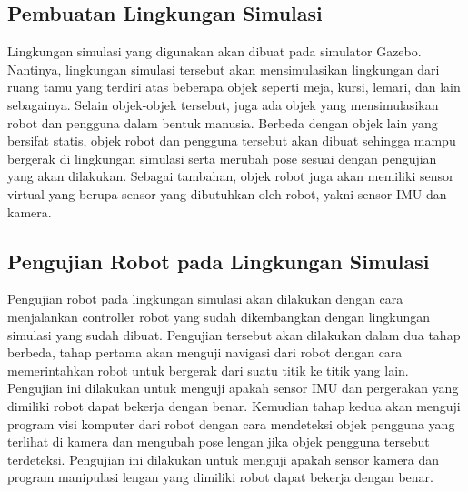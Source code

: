 \subsection{Pembuatan Lingkungan Simulasi}

Lingkungan simulasi yang digunakan akan dibuat pada simulator Gazebo.
Nantinya, lingkungan simulasi tersebut akan mensimulasikan lingkungan dari ruang tamu yang terdiri atas beberapa objek seperti meja, kursi, lemari, dan lain sebagainya.
Selain objek-objek tersebut, juga ada objek yang mensimulasikan robot dan pengguna dalam bentuk manusia.
Berbeda dengan objek lain yang bersifat statis, objek robot dan pengguna tersebut akan dibuat sehingga mampu bergerak di lingkungan simulasi serta merubah pose sesuai dengan pengujian yang akan dilakukan.
Sebagai tambahan, objek robot juga akan memiliki sensor virtual yang berupa sensor yang dibutuhkan oleh robot, yakni sensor IMU dan kamera.

\subsection{Pengujian Robot pada Lingkungan Simulasi}

Pengujian robot pada lingkungan simulasi akan dilakukan dengan cara menjalankan controller robot yang sudah dikembangkan dengan lingkungan simulasi yang sudah dibuat.
Pengujian tersebut akan dilakukan dalam dua tahap berbeda, tahap pertama akan menguji navigasi dari robot dengan cara memerintahkan robot untuk bergerak dari suatu titik ke titik yang lain.
Pengujian ini dilakukan untuk menguji apakah sensor IMU dan pergerakan yang dimiliki robot dapat bekerja dengan benar.
Kemudian tahap kedua akan menguji program visi komputer dari robot dengan cara mendeteksi objek pengguna yang terlihat di kamera dan mengubah pose lengan jika objek pengguna tersebut terdeteksi.
Pengujian ini dilakukan untuk menguji apakah sensor kamera dan program manipulasi lengan yang dimiliki robot dapat bekerja dengan benar.
